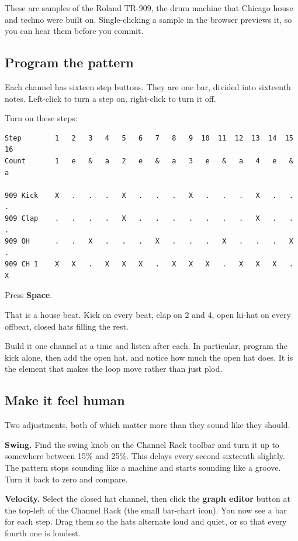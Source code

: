 These are samples of the Roland TR-909, the drum machine that Chicago house and techno were
built on. Single-clicking a sample in the browser previews it, so you can hear them before
you commit.

\subsection{Program the pattern}\label{fl02_first_beat-program-the-pattern}

Each channel has sixteen step buttons. They are one bar, divided into sixteenth notes.
Left-click to turn a step on, right-click to turn it off.

Turn on these steps:

\begin{verbatim}
Step        1   2   3   4   5   6   7   8   9  10  11  12  13  14  15  16
Count       1   e   &   a   2   e   &   a   3   e   &   a   4   e   &   a

909 Kick    X   .   .   .   X   .   .   .   X   .   .   .   X   .   .   .
909 Clap    .   .   .   .   X   .   .   .   .   .   .   .   X   .   .   .
909 OH      .   .   X   .   .   .   X   .   .   .   X   .   .   .   X   .
909 CH 1    X   X   .   X   X   X   .   X   X   X   .   X   X   X   .   X
\end{verbatim}

Press \textbf{Space}.

That is a house beat. Kick on every beat, clap on 2 and 4, open hi-hat on every offbeat,
closed hats filling the rest.

Build it one channel at a time and listen after each. In particular, program the kick alone,
then add the open hat, and notice how much the open hat does. It is the element that makes
the loop move rather than just plod.

\subsection{Make it feel human}\label{fl02_first_beat-make-it-feel-human}

Two adjustments, both of which matter more than they sound like they should.

\textbf{Swing.} Find the swing knob on the Channel Rack toolbar and turn it up to somewhere
between 15\% and 25\%. This delays every second sixteenth slightly. The pattern stops sounding
like a machine and starts sounding like a groove. Turn it back to zero and compare.

\textbf{Velocity.} Select the closed hat channel, then click the \textbf{graph editor} button at the
top-left of the Channel Rack (the small bar-chart icon). You now see a bar for each step.
Drag them so the hats alternate loud and quiet, or so that every fourth one is loudest.

